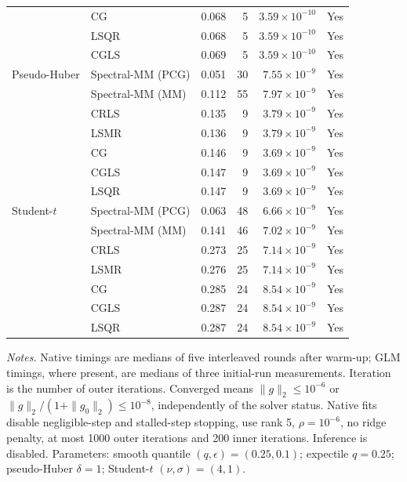 \begin{longtable}{llrrrc}
 & CG & 0.068 & 5 & $3.59\times10^{-10}$ & Yes \\
 & LSQR & 0.068 & 5 & $3.59\times10^{-10}$ & Yes \\
 & CGLS & 0.069 & 5 & $3.59\times10^{-10}$ & Yes \\
\midrule
Pseudo-Huber & Spectral-MM (PCG) & 0.051 & 30 & $7.55\times10^{-9}$ & Yes \\
 & Spectral-MM (MM) & 0.112 & 55 & $7.97\times10^{-9}$ & Yes \\
 & CRLS & 0.135 & 9 & $3.79\times10^{-9}$ & Yes \\
 & LSMR & 0.136 & 9 & $3.79\times10^{-9}$ & Yes \\
 & CG & 0.146 & 9 & $3.69\times10^{-9}$ & Yes \\
 & CGLS & 0.147 & 9 & $3.69\times10^{-9}$ & Yes \\
 & LSQR & 0.147 & 9 & $3.69\times10^{-9}$ & Yes \\
\midrule
Student-$t$ & Spectral-MM (PCG) & 0.063 & 48 & $6.66\times10^{-9}$ & Yes \\
 & Spectral-MM (MM) & 0.141 & 46 & $7.02\times10^{-9}$ & Yes \\
 & CRLS & 0.273 & 25 & $7.14\times10^{-9}$ & Yes \\
 & LSMR & 0.276 & 25 & $7.14\times10^{-9}$ & Yes \\
 & CG & 0.285 & 24 & $8.54\times10^{-9}$ & Yes \\
 & CGLS & 0.287 & 24 & $8.54\times10^{-9}$ & Yes \\
 & LSQR & 0.287 & 24 & $8.54\times10^{-9}$ & Yes \\
\end{longtable}
\noindent\textit{Notes.} Native timings are medians of five interleaved rounds after warm-up; GLM timings, where present, are medians of three initial-run measurements. Iteration is the number of outer iterations. Converged means $\|g\|_2\leq10^{-6}$ or $\|g\|_2/(1+\|g_0\|_2)\leq10^{-8}$, independently of the solver status. Native fits disable negligible-step and stalled-step stopping, use rank 5, $\rho=10^{-6}$, no ridge penalty, at most 1000 outer iterations and 200 inner iterations. Inference is disabled.
Parameters: smooth quantile $(q,\epsilon)=(0.25,0.1)$; expectile $q=0.25$; pseudo-Huber $\delta=1$; Student-$t$ $(\nu,\sigma)=(4,1)$.
\par
\endgroup

